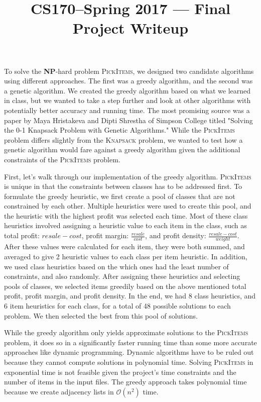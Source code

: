 \documentclass[11pt]{article}
\title{CS170--Spring 2017 --- Final Project Writeup}
\author{\Name}
\date{}
\begin{document}
\maketitle

To solve the \textbf{NP}-hard problem \textsc{PickItems}, we designed two candidate algorithms using different approaches. The first was a greedy algorithm, and the second was a genetic algorithm. We created the greedy algorithm based on what we learned in class, but we wanted to take a step further and look at other algorithms with potentially better accuracy and running time. The most promising source was a paper by Maya Hristakeva and Dipti Shrestha of Simpson College titled "Solving the 0-1 Knapsack Problem with Genetic Algorithms." While the \textsc{PickItems} problem differs slightly from the \textsc{Knapsack} problem, we wanted to test how a genetic algorithm would fare against a greedy algorithm given the additional constraints of the \textsc{PickItems} problem.

\vspace{4pt}

First, let's walk through our implementation of the greedy algorithm. \textsc{PickItems} is unique in that the constraints between classes has to be addressed first. To formulate the greedy heuristic, we first create a pool of classes that are not constrained by each other.  Multiple heuristics were used to create this pool, and the heuristic with the highest profit was selected each time.  Most of these class heuristics involved assigning a heuristic value to each item in the class, such as total profit: ${resale - cost}$, profit margin: $\frac{resale}{cost}$, and profit  density: $\frac{resale - cost}{weight}$.  After these values were calculated for each item, they were both summed, and averaged to give 2 heuristic values to each class per item heuristic.  In addition, we used class heuristics based on the which ones had the least number of constraints, and also randomly. After assigning these heuristics and selecting pools of classes, we selected items greedily based on the above mentioned total profit, profit margin, and profit density.  In the end, we had 8 class heuristics, and 6 item heuristics for each class, for a total of 48 possible solutions to each problem.  We then selected the best from this pool of solutions.

\vspace{4pt}

While the greedy algorithm only yields approximate solutions to the \textsc{PickItems} problem, it does so in a significantly faster running time than some more accurate approaches like dynamic programming. Dynamic algorithms have to be ruled out because they cannot compute solutions in polynomial time. Solving \textsc{PickItems} in exponential time is not feasible given the project's time constraints and the number of items in the input files. The greedy approach takes polynomial time because we create adjacency lists in $\mathcal{O}(n^2)$ time.
\end{document}
